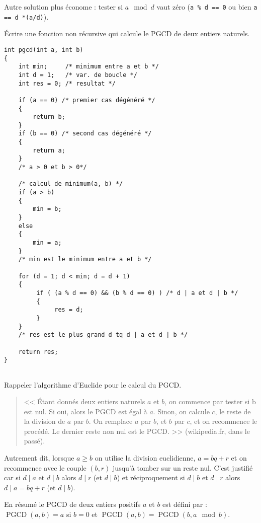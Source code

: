 \begin{newenu}
\begin{correction}
Autre solution plus économe : tester si $a \mod d$ vaut zéro (\verb+a % d == 0+ ou bien \verb+a == d *(a/d)+).

 \end{correction}
\item Écrire une fonction non récursive qui calcule le PGCD de deux entiers naturels.

  \begin{correction}
    \begin{verbatim}
int pgcd(int a, int b)
{
    int min;     /* minimum entre a et b */
    int d = 1;   /* var. de boucle */
    int res = 0; /* resultat */

    if (a == 0) /* premier cas dégénéré */
    {
        return b;
    }   
    if (b == 0) /* second cas dégénéré */
    {
        return a;
    }
    /* a > 0 et b > 0*/

    /* calcul de minimum(a, b) */
    if (a > b)
    {
        min = b;
    }
    else
    {
        min = a;
    }
    /* min est le minimum entre a et b */
    
    for (d = 1; d < min; d = d + 1)
    {
         if ( (a % d == 0) && (b % d == 0) ) /* d | a et d | b */
         {
              res = d;
         }
    }
    /* res est le plus grand d tq d | a et d | b */

    return res;
}


\end{verbatim}
\end{correction}

\item Rappeler l'algorithme d'Euclide pour le calcul du PGCD.
  \begin{correction}
    \begin{quote}
  << Étant donnés deux entiers naturels $a$ et $b$, on
commence par tester si b est nul. Si oui, alors le PGCD est égal à
$a$. Sinon, on calcule $c$, le reste de la division de $a$ par $b$. On
remplace $a$ par $b$, et $b$ par $c$, et on recommence le procédé. Le
dernier reste non nul est le PGCD. >> (wikipedia.fr, dans le passé).
\end{quote}

Autrement dit, lorsque $a \geq b$ on utilise la division euclidienne, $a = bq + r$ et on recommence avec le couple $(b, r)$ jusqu'à tomber sur un reste nul. C'est justifié car si $d \mid a$ et $d \mid b$  alors $d \mid r$ (et $d \mid b$) et réciproquement si $d \mid b$ et $d \mid r$ alors $d \mid a = bq  + r$ (et $d\mid b$).

En résumé le PGCD de deux entiers positifs $a$ et $b$
est défini par : $\operatorname{PGCD}(a, b) = a$ si $ b = 0$ et
$\operatorname{PGCD}(a, b) = \operatorname{PGCD}(b, a \mod b)$.


\end{correction}
\end{newenu}
